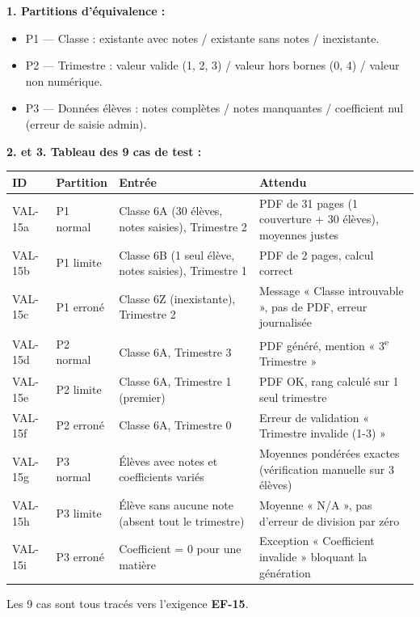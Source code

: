 \documentclass[11pt]{article}
\begin{document}
\begin{corrige}
\textbf{1. Partitions d'équivalence :}
\begin{itemize}
    \item P1 — Classe : existante avec notes / existante sans notes / inexistante.
    \item P2 — Trimestre : valeur valide (1, 2, 3) / valeur hors bornes (0, 4) / valeur non numérique.
    \item P3 — Données élèves : notes complètes / notes manquantes / coefficient nul (erreur de saisie admin).
\end{itemize}

\textbf{2. et 3. Tableau des 9 cas de test :}

\begin{center}
\begin{tabularx}{\linewidth}{|l|l|X|X|}
\hline
\rowcolor{popblueL}
\textbf{ID} & \textbf{Partition} & \textbf{Entrée} & \textbf{Attendu} \\
\hline
VAL-15a & P1 normal & Classe 6A (30 élèves, notes saisies), Trimestre 2 & PDF de 31 pages (1 couverture + 30 élèves), moyennes justes \\
\hline
VAL-15b & P1 limite & Classe 6B (1 seul élève, notes saisies), Trimestre 1 & PDF de 2 pages, calcul correct \\
\hline
VAL-15c & P1 erroné & Classe 6Z (inexistante), Trimestre 2 & Message « Classe introuvable », pas de PDF, erreur journalisée \\
\hline
VAL-15d & P2 normal & Classe 6A, Trimestre 3 & PDF généré, mention « 3\textsuperscript{e} Trimestre » \\
\hline
VAL-15e & P2 limite & Classe 6A, Trimestre 1 (premier) & PDF OK, rang calculé sur 1 seul trimestre \\
\hline
VAL-15f & P2 erroné & Classe 6A, Trimestre 0 & Erreur de validation « Trimestre invalide (1-3) » \\
\hline
VAL-15g & P3 normal & Élèves avec notes et coefficients variés & Moyennes pondérées exactes (vérification manuelle sur 3 élèves) \\
\hline
VAL-15h & P3 limite & Élève sans aucune note (absent tout le trimestre) & Moyenne « N/A », pas d'erreur de division par zéro \\
\hline
VAL-15i & P3 erroné & Coefficient = 0 pour une matière & Exception « Coefficient invalide » bloquant la génération \\
\hline
\end{tabularx}
\end{center}
Les 9 cas sont tous tracés vers l'exigence \textbf{EF-15}.


\end{corrige}
\end{document}
